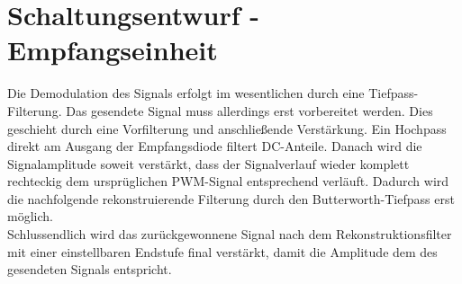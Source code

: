 \section{Schaltungsentwurf - Empfangseinheit}
Die Demodulation des Signals erfolgt im wesentlichen durch eine Tiefpass-Filterung. Das gesendete Signal muss allerdings erst vorbereitet werden. Dies geschieht durch eine Vorfilterung und anschließende Verstärkung. Ein Hochpass direkt am Ausgang der Empfangsdiode filtert DC-Anteile. Danach wird die Signalamplitude soweit verstärkt, dass der Signalverlauf wieder komplett rechteckig dem ursprüglichen PWM-Signal entsprechend verläuft. Dadurch wird die nachfolgende rekonstruierende Filterung durch den Butterworth-Tiefpass erst möglich. \\ Schlussendlich wird das zurückgewonnene Signal nach dem Rekonstruktionsfilter mit einer einstellbaren Endstufe final verstärkt, damit die Amplitude dem des gesendeten Signals entspricht.


